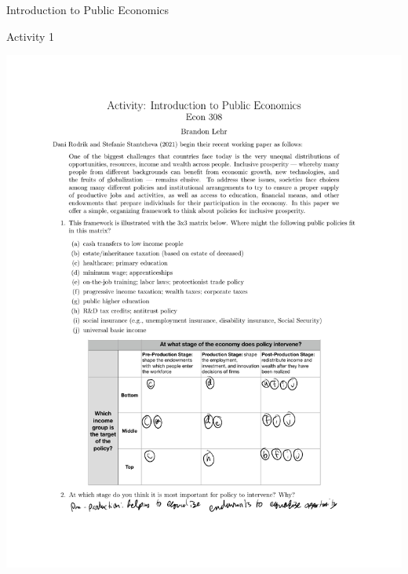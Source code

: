 \documentclass[10pt]{extarticle}
\begin{document}
\begin{problem}{Introduction to Public Economics}
\begin{problem}{Activity 1}
\begin{center}
        \includegraphics[width=\textwidth]{Activity_1.pdf}
      \end{center}
    \end{problem}
  \end{problem}
\end{document}
